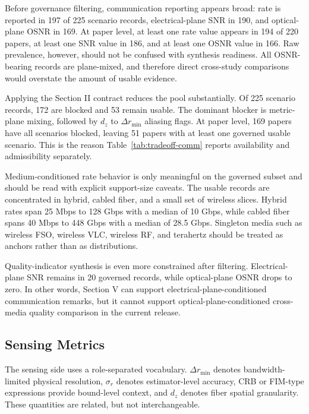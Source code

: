 Before governance filtering, communication reporting appears broad: rate is reported in 197 of 225 scenario records, electrical-plane SNR in 190, and optical-plane OSNR in 169. At paper level, at least one rate value appears in 194 of 220 papers, at least one SNR value in 186, and at least one OSNR value in 166. Raw prevalence, however, should not be confused with synthesis readiness. All OSNR-bearing records are plane-mixed, and therefore direct cross-study comparisons would overstate the amount of usable evidence.

Applying the Section II contract reduces the pool substantially. Of 225 scenario records, 172 are blocked and 53 remain usable. The dominant blocker is metric-plane mixing, followed by $d_z$ to $\Delta r_{\min}$ aliasing flags. At paper level, 169 papers have all scenarios blocked, leaving 51 papers with at least one governed usable scenario. This is the reason Table~\ref{tab:tradeoff-comm} reports availability and admissibility separately.

Medium-conditioned rate behavior is only meaningful on the governed subset and should be read with explicit support-size caveats. The usable records are concentrated in hybrid, cabled fiber, and a small set of wireless slices. Hybrid rates span 25 Mbps to 128 Gbps with a median of 10 Gbps, while cabled fiber spans 40 Mbps to 448 Gbps with a median of 28.5 Gbps. Singleton media such as wireless FSO, wireless VLC, wireless RF, and terahertz should be treated as anchors rather than as distributions.

Quality-indicator synthesis is even more constrained after filtering. Electrical-plane SNR remains in 20 governed records, while optical-plane OSNR drops to zero. In other words, Section V can support electrical-plane-conditioned communication remarks, but it cannot support optical-plane-conditioned cross-media quality comparison in the current release.

\subsection{Sensing Metrics}
\label{sec:tradeoff-sensing}

The sensing side uses a role-separated vocabulary. $\Delta r_{\min}$ denotes bandwidth-limited physical resolution, $\sigma_r$ denotes estimator-level accuracy, CRB or FIM-type expressions provide bound-level context, and $d_z$ denotes fiber spatial granularity. These quantities are related, but not interchangeable.

